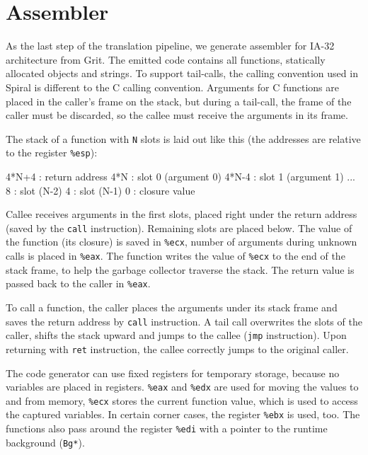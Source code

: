 \section{Assembler}

As the last step of the translation pipeline, we generate assembler for
IA-32 architecture from Grit. The emitted code contains all functions,
statically allocated objects and strings. To support tail-calls, the calling
convention used in Spiral is different to the C calling convention.
Arguments for C functions are placed in the caller's frame on the stack, but
during a tail-call, the frame of the caller must be discarded, so the callee
must receive the arguments in its frame.

The stack of a function with \texttt{N} slots is laid out like this (the
addresses are relative to the register \texttt{\%esp}):

\begin{ttcode}
  4*N+4  :  return address
    4*N  :  slot 0 (argument 0)
  4*N-4  :  slot 1 (argument 1)
            ...
      8  :  slot (N-2)
      4  :  slot (N-1)
      0  :  closure value
\end{ttcode}

Callee receives arguments in the first slots, placed right under the return
address (saved by the \texttt{call} instruction). Remaining slots are placed
below. The value of the function (its closure) is saved in \texttt{\%ecx},
number of arguments during unknown calls is placed in \texttt{\%eax}. The
function writes the value of \texttt{\%ecx} to the end of the stack frame, to
help the garbage collector traverse the stack. The return value is passed back
to the caller in \texttt{\%eax}.

To call a function, the caller places the arguments under its stack frame and saves
the return address by \texttt{call} instruction. A tail call overwrites the
slots of the caller, shifts the stack upward and jumps to the callee
(\texttt{jmp} instruction). Upon returning with \texttt{ret} instruction, the
callee correctly jumps to the original caller.

The code generator can use fixed registers for temporary storage, because no
variables are placed in registers. \texttt{\%eax} and \texttt{\%edx} are used
for moving the values to and from memory, \texttt{\%ecx} stores the current
function value, which is used to access the captured variables. In certain
corner cases, the register \texttt{\%ebx} is used, too. The functions also
pass around the register \texttt{\%edi} with a pointer to the runtime background
(\texttt{Bg*}).
